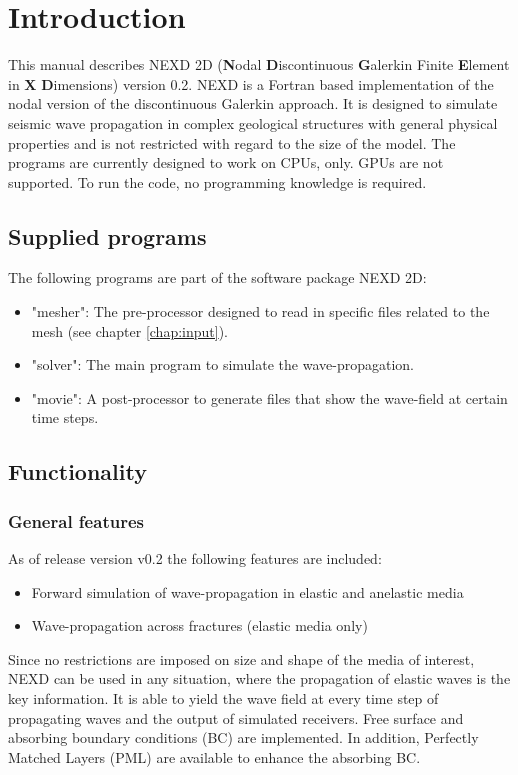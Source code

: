\chapter{Introduction}
\label{introduction} %

This manual describes NEXD 2D (\textbf{N}odal \textbf{D}iscontinuous \textbf{G}alerkin Finite \textbf{E}lement in \textbf{X} \textbf{D}imensions) version 0.2. NEXD is a Fortran based implementation of the nodal version of the discontinuous Galerkin approach. It is designed to simulate seismic wave propagation in complex geological structures with general physical properties and is not restricted with regard to the size of the model. The programs are currently designed to work on CPUs, only. GPUs are not supported. To run the code, no programming knowledge is required.     
\section{Supplied programs}
	The following programs are part of the software package NEXD 2D:
	\begin{itemize}
		\item "mesher": The pre-processor designed to read in specific files related to the mesh (see chapter \ref{chap:input}).
		\item "solver": The main program to simulate the wave-propagation.
		\item "movie": A post-processor to generate files that show the wave-field at certain time steps.
	\end{itemize}
\section{Functionality}
\label{functions and applications}
	\subsection{General features}    
    As of release version v0.2 the following features are included:
    \begin{itemize}
        \item Forward simulation of wave-propagation in elastic and anelastic media
        \item Wave-propagation across fractures (elastic media only)
    \end{itemize}
    Since no restrictions are imposed on size and shape of the media of interest, NEXD can be used in any situation, where the propagation of elastic waves is the key information. It is able to yield the wave field at every time step of propagating waves and the output of simulated receivers. Free surface and absorbing boundary conditions (BC) are implemented. In addition, Perfectly Matched Layers (PML) \citep{Lambrecht.2017} are available to enhance the absorbing BC.
